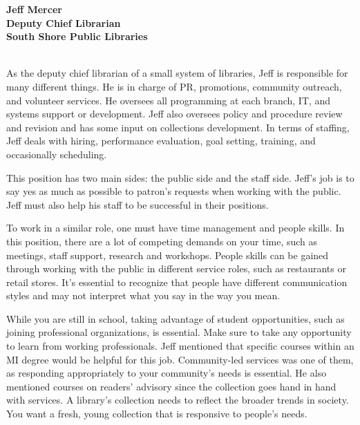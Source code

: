 \documentclass[
  letterpaper,
  DIV=11,
  numbers=noendperiod]{scrreprt}
\begin{document}
\begin{tcolorbox}[enhanced jigsaw, arc=.35mm, bottomrule=.15mm, bottomtitle=1mm, breakable, colback=white, colbacktitle=quarto-callout-tip-color!10!white, colframe=quarto-callout-tip-color-frame, coltitle=black, left=2mm, leftrule=.75mm, opacityback=0, opacitybacktitle=0.6, rightrule=.15mm, title=\textcolor{quarto-callout-tip-color}{\faLightbulb}\hspace{0.5em}{Meet a professional}, titlerule=0mm, toprule=.15mm, toptitle=1mm]

\textbf{Jeff Mercer\\
Deputy Chief Librarian\\
South Shore Public Libraries}\\
\strut \\
As the deputy chief librarian of a small system of libraries, Jeff is
responsible for many different things. He is in charge of PR,
promotions, community outreach, and volunteer services. He oversees all
programming at each branch, IT, and systems support or development. Jeff
also oversees policy and procedure review and revision and has some
input on collections development. In terms of staffing, Jeff deals with
hiring, performance evaluation, goal setting, training, and occasionally
scheduling.

This position has two main sides: the public side and the staff side.
Jeff's job is to say yes as much as possible to patron's requests when
working with the public. Jeff must also help his staff to be successful
in their positions.

To work in a similar role, one must have time management and people
skills. In this position, there are a lot of competing demands on your
time, such as meetings, staff support, research and workshops. People
skills can be gained through working with the public in different
service roles, such as restaurants or retail stores. It's essential to
recognize that people have different communication styles and may not
interpret what you say in the way you mean.

While you are still in school, taking advantage of student
opportunities, such as joining professional organizations, is essential.
Make sure to take any opportunity to learn from working professionals.
Jeff mentioned that specific courses within an MI degree would be
helpful for this job. Community-led services was one of them, as
responding appropriately to your community's needs is essential. He also
mentioned courses on readers' advisory since the collection goes hand in
hand with services. A library's collection needs to reflect the broader
trends in society. You want a fresh, young collection that is responsive
to people's needs.


\end{tcolorbox}
\end{document}
